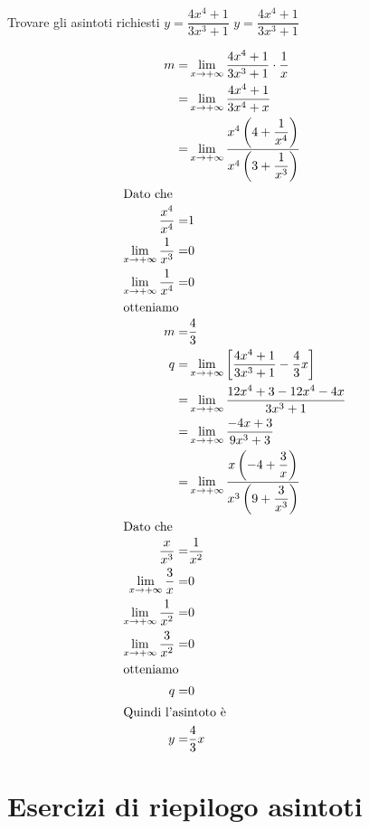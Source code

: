 \begin{exercise}
	Trovare gli asintoti richiesti
	$y=\dfrac{4x^4+1}{3x^3+1}$
	\tcblower
	$y=\dfrac{4x^4+1}{3x^3+1}$	
	
	\begin{align*}
	m=&\lim_{x\to +\infty}\dfrac{4x^4+1}{3x^3+1}\cdot\dfrac{1}{x}\\
	=&\lim_{x\to +\infty}\dfrac{4x^4+1}{3x^4+x}\\
	=&\lim_{x\to +\infty}\dfrac{x^4\left(4+\dfrac{1}{x^4}\right)}{x^4\left(3+\dfrac{1}{x^3}\right)}\\
	\intertext{Dato che}
	\dfrac{x^4}{x^4}=&1\\
	\lim_{x\to +\infty}\dfrac{1}{x^3}=&0\\
	\lim_{x\to +\infty}\dfrac{1}{x^4}=&0\\
	\intertext{otteniamo}
	m=&\dfrac{4}{3}\\
	q=&\lim_{x\to +\infty}\left[\dfrac{4x^4+1}{3x^3+1}-\dfrac{4}{3}x\right]\\
	=&\lim_{x\to +\infty}\dfrac{12x^4+3-12x^4-4x}{3x^3+1}\\
	=&\lim_{x\to +\infty}\dfrac{-4x+3}{9x^3+3}\\
	=&\lim_{x\to +\infty}\dfrac{x\left(-4+\dfrac{3}{x}\right)}{x^3\left(9+\dfrac{3}{x^3}\right)}\\
	\intertext{Dato che}
	\dfrac{x}{x^3}=&\dfrac{1}{x^2}\\
	\lim_{x\to +\infty}\dfrac{3}{x}=&0\\
	\lim_{x\to +\infty}\dfrac{1}{x^2}=&0\\
	\lim_{x\to +\infty}\dfrac{3}{x^2}=&0\\
	\intertext{otteniamo}
	q=&0\\
	\intertext{Quindi l'asintoto è}
	y=&\dfrac{4}{3}x
	\end{align*}
\end{exercise}
\section{Esercizi di riepilogo asintoti}
 

